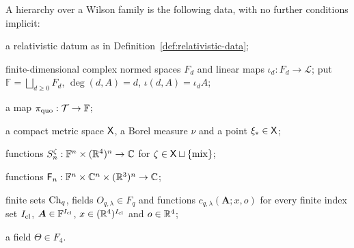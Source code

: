 \begin{definition}\label{def:hierarchy}
A hierarchy over a Wilson family is the following data, with no further conditions implicit:

\begin{description}[font=\normalfont,leftmargin=3.8em,labelindent=0pt,nosep]
\item[H1.] a relativistic datum as in Definition~\ref{def:relativistic-data};
\item[H2.] finite-dimensional complex normed spaces $F_d$ and linear maps $\iota_d:F_d\to\mathcal L$; put $\mathbb F=\bigsqcup_{d\ge0}F_d$, $\deg(d,A)=d$, $\iota(d,A)=\iota_dA$;
\item[H3.] a map $\pi_{\rm quo}:\mathcal T\to\mathbb F$;
\item[H4.] a compact metric space $\mathsf{X}$, a Borel measure $\nu$ and a point $\xi_*\in\mathsf{X}$;
\item[H5.] functions $S_n^\zeta:\mathbb F^n\times(\mathbb{R}^4)^n\to\mathbb{C}$ for $\zeta\in\mathsf{X}\sqcup\{\mathrm{mix}\}$;
\item[H6.] functions $\mathsf F_n:\mathbb F^n\times\mathbb{C}^n\times(\mathbb{R}^3)^n\to\mathbb{C}$;
\item[H7.] finite sets $\mathrm{Ch}_{q}$, fields $O_{q,\lambda}\in F_q$ and functions $c_{q,\lambda}(\boldsymbol A;x,o)$ for every finite index set $I_{\rm cl}$, $\boldsymbol A\in\mathbb F^{I_{\rm cl}}$, $x\in(\mathbb{R}^4)^{I_{\rm cl}}$ and $o\in\mathbb{R}^4$;
\item[H8.] a field $\Theta\in F_4$.
\end{description}
\end{definition}

